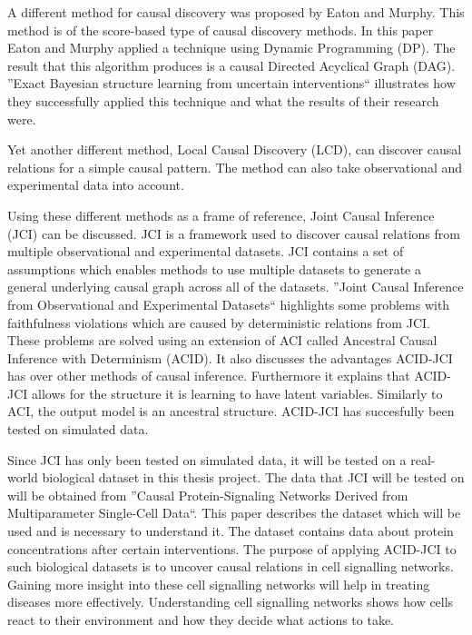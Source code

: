 \documentclass[11pt]{article}
\begin{document}
A different method for causal discovery was proposed by Eaton and Murphy\cite{eaton2007exact}. This method is of the score-based type of causal discovery methods. In this paper Eaton and Murphy applied a technique using Dynamic Programming (DP). The result that this algorithm produces is a causal Directed Acyclical Graph (DAG). ''Exact Bayesian structure learning from uncertain interventions`` illustrates how they successfully applied this technique and what the results of their research were. \cite{eaton2007exact}
    
Yet another different method, Local Causal Discovery (LCD), can discover causal relations for a simple causal pattern. The method can also take observational and experimental data into account.\cite{cooper1999causal}

Using these different methods as a frame of reference, Joint Causal Inference (JCI) can be discussed. JCI is a framework used to discover causal relations from multiple observational and experimental datasets. JCI contains a set of assumptions which enables methods to use multiple datasets to generate a general underlying causal graph across all of the datasets. ''Joint Causal Inference from Observational and Experimental Datasets`` highlights some problems with faithfulness violations which are caused by deterministic relations from JCI. These problems are solved using an extension of ACI called Ancestral Causal Inference with Determinism (ACID). It also discusses the advantages ACID-JCI has over other methods of causal inference. Furthermore it explains that ACID-JCI allows for the structure it is learning to have latent variables. Similarly to ACI, the output model is an ancestral structure. ACID-JCI has succesfully been tested on simulated data.\cite{jci}

Since JCI has only been tested on simulated data, it will be tested on a real-world biological dataset in this thesis project.  The data that JCI will be tested on will be obtained from ''Causal Protein-Signaling Networks Derived from Multiparameter Single-Cell Data``. This paper describes the dataset which will be used and is necessary to understand it. \cite{sachs2005causal} The dataset contains data about protein concentrations after certain interventions. The purpose of applying ACID-JCI to such biological datasets is to uncover causal relations in cell signalling networks. Gaining more insight into these cell signalling networks will help in treating diseases more effectively. Understanding cell signalling networks shows how cells react to their environment and how they decide what actions to take.
\end{document}
